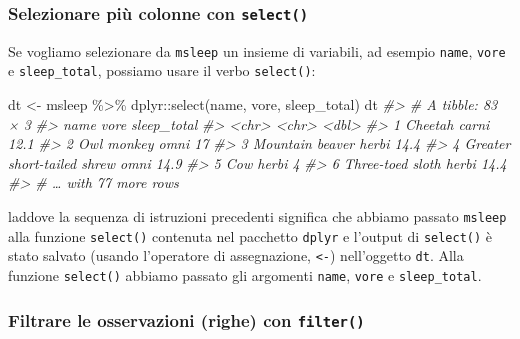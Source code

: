 \documentclass[
  10pt,
  italian,
  a4paper,
  extrafontsizes,onecolumn,openright
  ]{memoir}
\newenvironment{Shaded}{\begin{snugshade}}{\end{snugshade}}
\newcommand{\CommentTok}[1]{\textcolor[rgb]{0.56,0.35,0.01}{\textit{#1}}}
\newcommand{\FunctionTok}[1]{\textcolor[rgb]{0.00,0.00,0.00}{#1}}
\newcommand{\NormalTok}[1]{#1}
\newcommand{\OtherTok}[1]{\textcolor[rgb]{0.56,0.35,0.01}{#1}}
\newcommand{\SpecialCharTok}[1]{\textcolor[rgb]{0.00,0.00,0.00}{#1}}
\begin{document}
\hypertarget{selezionare-piuxf9-colonne-con-select}{%
\subsubsection{\texorpdfstring{Selezionare più colonne con \texttt{select()}}{Selezionare più colonne con select()}}\label{selezionare-piuxf9-colonne-con-select}}

Se vogliamo selezionare da \texttt{msleep} un insieme di variabili, ad esempio \texttt{name}, \texttt{vore} e \texttt{sleep\_total}, possiamo usare il verbo \texttt{select()}:

\begin{Shaded}
\begin{Highlighting}[]
\NormalTok{dt }\OtherTok{\textless{}{-}}\NormalTok{ msleep }\SpecialCharTok{\%\textgreater{}\%}
\NormalTok{  dplyr}\SpecialCharTok{::}\FunctionTok{select}\NormalTok{(name, vore, sleep\_total)}
\NormalTok{dt}
\CommentTok{\#\textgreater{} \# A tibble: 83 × 3}
\CommentTok{\#\textgreater{}   name                       vore  sleep\_total}
\CommentTok{\#\textgreater{}   \textless{}chr\textgreater{}                      \textless{}chr\textgreater{}       \textless{}dbl\textgreater{}}
\CommentTok{\#\textgreater{} 1 Cheetah                    carni        12.1}
\CommentTok{\#\textgreater{} 2 Owl monkey                 omni         17  }
\CommentTok{\#\textgreater{} 3 Mountain beaver            herbi        14.4}
\CommentTok{\#\textgreater{} 4 Greater short{-}tailed shrew omni         14.9}
\CommentTok{\#\textgreater{} 5 Cow                        herbi         4  }
\CommentTok{\#\textgreater{} 6 Three{-}toed sloth           herbi        14.4}
\CommentTok{\#\textgreater{} \# … with 77 more rows}
\end{Highlighting}
\end{Shaded}

\noindent
laddove la sequenza di istruzioni precedenti significa che abbiamo passato \texttt{msleep} alla funzione \texttt{select()} contenuta nel pacchetto \texttt{dplyr} e l'output di \texttt{select()} è stato salvato (usando l'operatore di assegnazione, \texttt{\textless{}-}) nell'oggetto \texttt{dt}. Alla funzione \texttt{select()} abbiamo passato gli argomenti \texttt{name}, \texttt{vore} e \texttt{sleep\_total}.

\hypertarget{filtrare-le-osservazioni-righe-con-filter}{%
\subsubsection{\texorpdfstring{Filtrare le osservazioni (righe) con \texttt{filter()}}{Filtrare le osservazioni (righe) con filter()}}\label{filtrare-le-osservazioni-righe-con-filter}}
\end{document}
